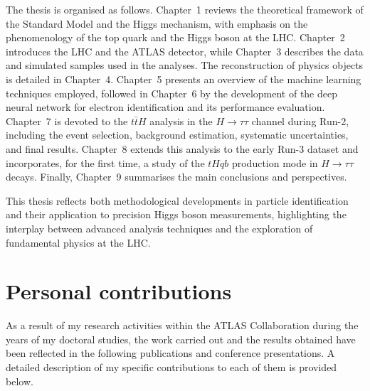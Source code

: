 The thesis is organised as follows. Chapter~1 reviews the theoretical framework of the Standard Model and the Higgs mechanism, with emphasis on the phenomenology of the top quark and the Higgs boson at the LHC. Chapter~2 introduces the LHC and the ATLAS detector, while Chapter~3 describes the data and simulated samples used in the analyses. The reconstruction of physics objects is detailed in Chapter~4. Chapter~5 presents an overview of the machine learning techniques employed, followed in Chapter~6 by the development of the deep neural network for electron identification and its performance evaluation. Chapter~7 is devoted to the $t\bar{t}H$ analysis in the $H\to\tau\tau$ channel during Run-2, including the event selection, background estimation, systematic uncertainties, and final results. Chapter~8 extends this analysis to the early Run-3 dataset and incorporates, for the first time, a study of the $tHqb$ production mode in $H \to \tau\tau$ decays. Finally, Chapter~9 summarises the main conclusions and perspectives.

This thesis reflects both methodological developments in particle identification and their application to precision Higgs boson measurements, highlighting the interplay between advanced analysis techniques and the exploration of fundamental physics at the LHC.

\section*{Personal contributions}

As a result of my research activities within the ATLAS Collaboration during the years of my doctoral studies, the work carried out and the results obtained have been reflected in the following publications and conference presentations. A detailed description of my specific contributions to each of them is provided below.

